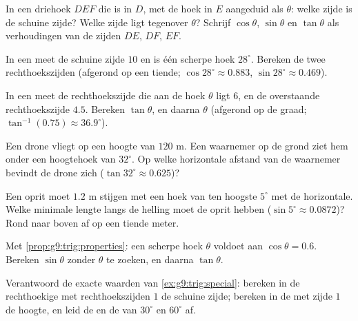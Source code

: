 \begin{exercise}[$\star$]\label{exo:g9:trig:3}
In een driehoek $DEF$ die  is in $D$, met de hoek in $E$ aangeduid als
$\theta$: welke zijde is de schuine zijde? Welke zijde ligt tegenover $\theta$?
Schrijf $\cos\theta$, $\sin\theta$ en $\tan\theta$ als verhoudingen van de zijden
$DE$, $DF$, $EF$.
\end{exercise}

\begin{exercise}[$\star$]\label{exo:g9:trig:4}
In een  meet de schuine zijde $10$ en is één scherpe hoek
$28^\circ$. Bereken de twee rechthoekszijden (afgerond op een tiende;
$\cos 28^\circ \approx 0.883$, $\sin 28^\circ \approx 0.469$).
\end{exercise}

\begin{exercise}[$\star$]\label{exo:g9:trig:5}
In een  meet de rechthoekszijde die aan de hoek $\theta$ ligt
$6$, en de overstaande rechthoekszijde $4.5$. Bereken $\tan\theta$, en daarna
$\theta$ (afgerond op de graad; $\tan^{-1}(0.75) \approx 36.9^\circ$).
\end{exercise}

\begin{exercise}[$\star\star$]\label{exo:g9:trig:6}
Een drone vliegt op een hoogte van $120$ m. Een waarnemer op de grond ziet hem
onder een hoogtehoek van $32^\circ$. Op welke horizontale afstand van de waarnemer
bevindt de drone zich ($\tan 32^\circ \approx 0.625$)?
\end{exercise}

\begin{exercise}[$\star\star$]\label{exo:g9:trig:7}
Een oprit moet $1.2$ m stijgen met een hoek van ten hoogste $5^\circ$ met de
horizontale. Welke minimale lengte langs de helling moet de oprit hebben
($\sin 5^\circ \approx 0.0872$)? Rond naar boven af op een tiende meter.
\end{exercise}

\begin{exercise}[$\star\star$]\label{exo:g9:trig:8}
Met \cref{prop:g9:trig:properties}: een scherpe hoek $\theta$ voldoet aan
$\cos\theta = 0.6$. Bereken $\sin\theta$ zonder $\theta$ te zoeken, en daarna
$\tan\theta$.
\end{exercise}

\begin{exercise}[$\star\star\star$]\label{exo:g9:trig:9}
Verantwoord de exacte waarden van \cref{ex:g9:trig:special}: bereken in de
rechthoekige  met rechthoekszijden $1$ de schuine zijde;
bereken in de  met zijde $1$ de hoogte, en leid de  en
de  van $30^\circ$ en $60^\circ$ af.
\end{exercise}

